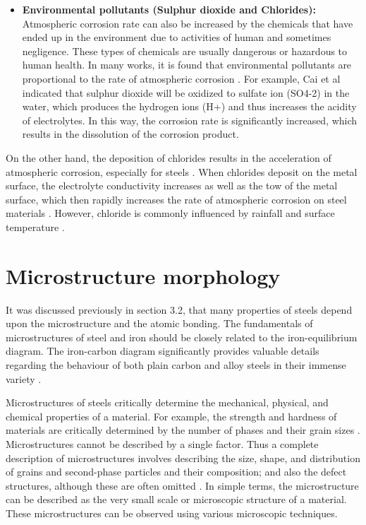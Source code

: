 \begin{itemize}
    \item \textbf{Environmental pollutants (Sulphur dioxide and Chlorides):} Atmospheric corrosion rate can also be increased by the chemicals that have ended up in the environment due to activities of human and sometimes negligence. These types of chemicals are usually dangerous or hazardous to human health. In many works, it is found that environmental pollutants are proportional to the rate of atmospheric corrosion \cite{soler2000metallic, dong2005deformation, islam2018effects}. For example, Cai et al \cite{cai2018influence} indicated that sulphur dioxide will be oxidized to sulfate ion (SO4-2) in the water, which produces the hydrogen ions (H+) and thus increases the acidity of electrolytes. In this way, the corrosion rate is significantly increased, which results in the dissolution of the corrosion product.
\end{itemize}
    
On the other hand, the deposition of chlorides results in the acceleration of atmospheric corrosion, especially for steels \cite{islam2018effects}. When chlorides deposit on the metal surface, the electrolyte conductivity increases as well as the \acrshort{tow} of the metal surface, which then rapidly increases the rate of atmospheric corrosion on steel materials \cite{marzorati2018green}. However, chloride is commonly influenced by rainfall and surface temperature \cite{cai2018influence}.

\section{Microstructure morphology} 
It was discussed previously in section 3.2, that many properties of steels depend upon the microstructure and the atomic bonding. The fundamentals of microstructures of steel and iron should be closely related to the iron-equilibrium diagram. The iron-carbon diagram significantly provides valuable details regarding the behaviour of both plain carbon and alloy steels in their immense variety \cite{bhadeshia2017steels}. 

Microstructures of steels critically determine the mechanical, physical, and chemical properties of a material. For example, the strength and hardness of materials are critically determined by the number of phases and their grain sizes \cite{clemens2017microstructure}. Microstructures cannot be described by a single factor. Thus a complete description of microstructures involves describing the size, shape, and distribution of grains and second-phase particles and their composition; and also the defect structures, although these are often omitted \cite{suryanarayana2017microstructure}. In simple terms, the microstructure can be described as the very small scale or microscopic structure of a material. These microstructures can be observed using various microscopic techniques.  

